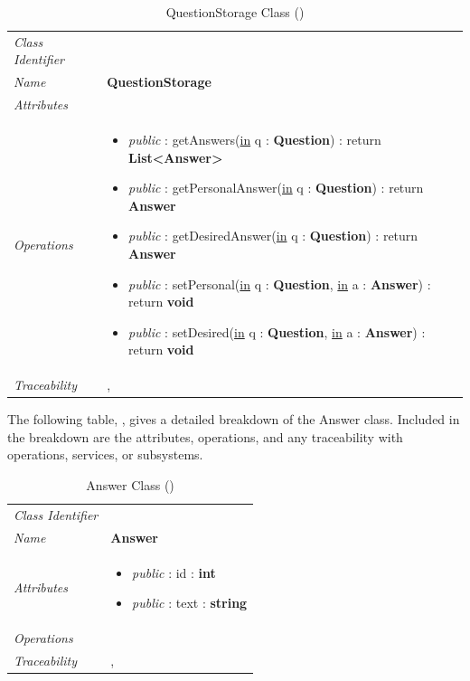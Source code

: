 \documentclass[12pt,letterpaper]{article}
\begin{document}
\begin{table}[H]
    \caption{QuestionStorage Class ()} 
	\begin{tabu} to 
		\toprule
		Class Identifier &  \\
		Name & {\bf QuestionStorage} \\
		Attributes & \\

		Operations &
		\begin{minipage}[t]{\linewidth}
			\begin{itemize}
			    \item {\it public} : getAnswers(\underline{in} q : {\bf Question}) : return {\bf List<Answer>}
			    \item {\it public} : getPersonalAnswer(\underline{in} q : {\bf Question}) : return {\bf Answer}
			    \item {\it public} : getDesiredAnswer(\underline{in} q : {\bf Question}) : return {\bf Answer}
			    \item {\it public} : setPersonal(\underline{in} q : {\bf Question}, \underline{in} a : {\bf Answer}) : return {\bf void}
			    \item {\it public} : setDesired(\underline{in} q : {\bf Question}, \underline{in} a : {\bf Answer}) : return {\bf void}
	        \end{itemize}
	    \end{minipage} \\
	    	Traceability & , \\
		\toprule
	\end{tabu}
\end{table}

The following table, , gives a detailed breakdown of the Answer class. Included in the breakdown are the attributes, operations, and any traceability with operations, services, or subsystems.

\begin{table}[H]
    \caption{Answer Class ()} 
	\begin{tabu} to 
		\toprule
		Class Identifier &  \\
		Name & {\bf Answer} \\
		Attributes & 
		\begin{minipage}[t]{\linewidth}
		    \begin{itemize}
		        \item \textit{public} : id : {\bf int}
		        \item \textit{public} : text : {\bf string}
			\end{itemize}
	    \end{minipage} \\

		Operations &\\
	    	Traceability & , \\
		\toprule
	\end{tabu}
\end{table}
\end{document}
